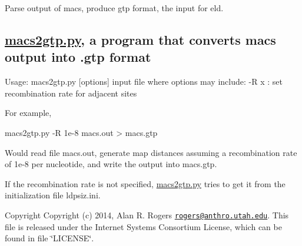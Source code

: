 Parse output of macs, produce gtp format, the input for eld.

\subsection*{\hyperlink{macs2gtp_8py}{macs2gtp.\+py}, a program that converts {\ttfamily macs} output into .gtp format }

\begin{DoxyVerb}Usage: macs2gtp.py [options] \<input file\> 
where options may include:
  -R \<x\> : set recombination rate for adjacent sites
\end{DoxyVerb}


For example, \begin{DoxyVerb}macs2gtp.py -R 1e-8 macs.out > macs.gtp
\end{DoxyVerb}


Would read file {\ttfamily macs.\+out}, generate map distances assuming a recombination rate of 1e-\/8 per nucleotide, and write the output into macs.\+gtp.

If the recombination rate is not specified, {\ttfamily \hyperlink{macs2gtp_8py}{macs2gtp.\+py}} tries to get it from the initialization file {\ttfamily ldpsiz.\+ini}.

\begin{DoxyCopyright}{Copyright}
Copyright (c) 2014, Alan R. Rogers \href{mailto:rogers@anthro.utah.edu}{\tt rogers@anthro.\+utah.\+edu}. This file is released under the Internet Systems Consortium License, which can be found in file \char`\"{}\+L\+I\+C\+E\+N\+S\+E\char`\"{}. 
\end{DoxyCopyright}

